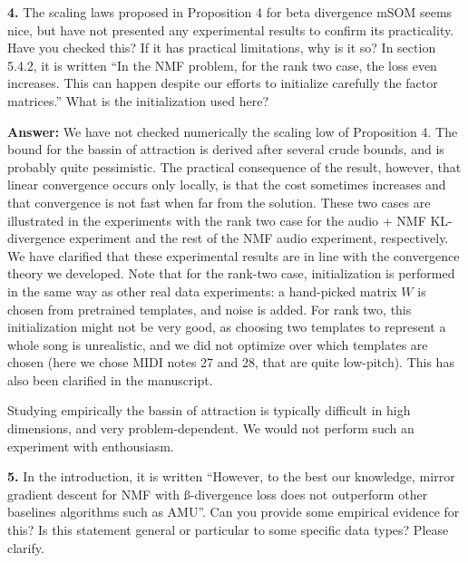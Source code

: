 \documentclass[10pt]{article} %
\newcommand{\answer}[1]{{\textbf{Answer:} \color{blue} #1}}
\begin{document}
\textbf{4.} The scaling laws proposed in Proposition 4 for beta divergence mSOM seems nice, but have not presented any experimental results to confirm its practicality. Have you checked this? If it has practical limitations, why is it so? In section 5.4.2, it is written “In the NMF problem, for the rank two case, the loss even increases. This can happen despite our efforts to initialize carefully the factor matrices.” What is the initialization used here?

\answer{
We have not checked numerically the scaling low of Proposition 4. The bound for the bassin of attraction is derived after several crude bounds, and is probably quite pessimistic. The practical consequence of the result, however, that linear convergence occurs only locally, is that the cost sometimes increases and that convergence is not fast when far from the solution. These two cases are illustrated in the experiments with the rank two case for the audio + NMF KL-divergence experiment and the rest of the NMF audio experiment, respectively. We have clarified that these experimental results are in line with the convergence theory we developed. Note that for the rank-two case, initialization is performed in the same way as other real data experiments: a hand-picked matrix $W$ is chosen from pretrained templates, and noise is added. For rank two, this initialization might not be very good, as choosing two templates to represent a whole song is unrealistic, and we did not optimize over which templates are chosen (here we chose MIDI notes 27 and 28, that are quite low-pitch). This has also been clarified in the manuscript.

Studying empirically the bassin of attraction is typically difficult in high dimensions, and very problem-dependent. We would not perform such an experiment with enthousiasm.
}

\textbf{5.} In the introduction, it is written “However, to the best our knowledge, mirror gradient descent for NMF with ß-divergence loss does not outperform other baselines algorithms such as AMU”. Can you provide some empirical evidence for this? Is this statement general or particular to some specific data types? Please clarify.
\end{document}
